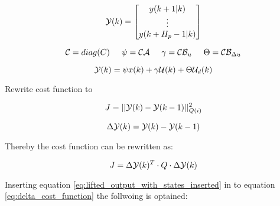 





\begin{equation}
	\CMcal{Y}(k)= 
	\begin{bmatrix}
	y(k+1|k)\\
	\vdots\\
	y(k+H_p-1|k)
	\end{bmatrix}
\end{equation}



\begin{equation}
	\CMcal{C} = diag(C) \hspace{5mm} \psi = \CMcal{C}\CMcal{A}  \hspace{5mm} \gamma = \CMcal{C}\CMcal{B}_u \hspace{5mm}  \Theta = \CMcal{C}\CMcal{B}_{\Delta u}
\end{equation}

\begin{equation}\label{eq:lifted_output_with_states_inserted}
	\CMcal{Y}(k) = \psi x(k) + \gamma \CMcal{U}(k) + \Theta \CMcal{U}_d(k)
\end{equation}





Rewrite cost function to

\begin{equation}
	J = ||\CMcal{Y}(k)-\CMcal{Y}(k-1)||_{Q(i)}^2
\end{equation}

\begin{equation}
	\Delta \CMcal{Y}(k) =\CMcal{Y}(k)-\CMcal{Y}(k-1) 
\end{equation}

Thereby the cost function can be rewritten as:

\begin{equation}\label{eq:delta_cost_function}
	J = \Delta\CMcal{Y}(k)^T \cdot Q \cdot \Delta\CMcal{Y}(k)
\end{equation}

Inserting equation \ref{eq:lifted_output_with_states_inserted} in to equation \ref{eq:delta_cost_function} the follwoing is optained:


